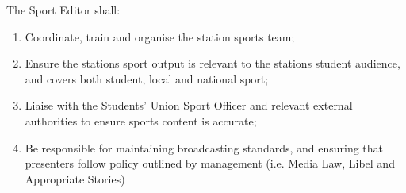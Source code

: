 \item The Sport Editor shall:
\begin{enumerate}[label*=\arabic*.]
    \item Coordinate, train and organise the station sports team;
    \item Ensure the stations sport output is relevant to the stations student audience, and covers both student, local and national sport;
    \item Liaise with the Students' Union Sport Officer and relevant external authorities to ensure sports content is accurate;
    \item Be responsible for maintaining broadcasting standards, and ensuring that presenters follow policy outlined by management (i.e. Media Law, Libel and Appropriate Stories)
\end{enumerate}
